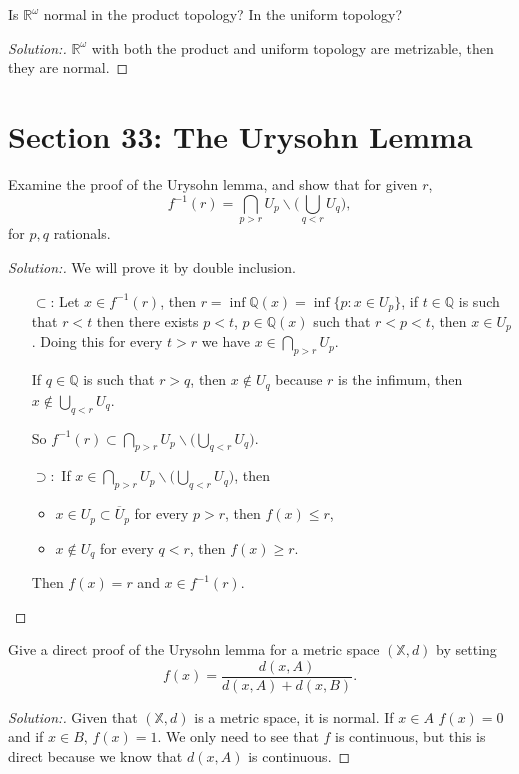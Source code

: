 \documentclass[a4paper,12pt, reqno]{article}
\theoremstyle{definition}
\newenvironment{exerr}[1]{
  \renewcommand\theexeralt{#1}
  \exeralt
}{\endexeralt}
\newenvironment{solution}{\begin{proof}[Solution:]}{\end{proof}}
\newcommand{\R}{\mathbb{R}}
\newcommand{\Q}{\mathbb{Q}}
\newcommand{\X}{\mathbb{X}}
\begin{document}
\begin{exerr}{5}
  Is $\R^\omega$ normal in the product topology? In the uniform topology?
\end{exerr}
\begin{solution}
  $\R^\omega$ with both the product and uniform topology are metrizable, then they are normal.
\end{solution}


\section*{Section 33: The Urysohn Lemma}

\begin{exerr}{1}
  Examine the proof of the Urysohn lemma, and show that for given $r$,
  \begin{equation*}
      f^{-1}(r) = \bigcap_{p>r}U_{p}\backslash\Big( \bigcup_{q<r} U_{q} \Big),
  \end{equation*}
  for $p,q$ rationals.
\end{exerr}
\begin{solution}
  We will prove it by double inclusion.
  \begin{itemize}
    \item[$\subset$:] Let $x\in f^{-1}(r)$, then $r = \inf\Q(x) = \inf\{ p : x\in U_{p} \}$, if $t\in \Q$ is such that $r<t$ then there exists $p<t$, $p\in\Q(x)$ such that $r<p<t$, then $x\in U_{p}$. Doing this for every $t>r$ we have $x\in\bigcap_{p>r}U_{p}$.
    
    If $q\in\Q$ is such that $r>q$, then $x\notin U_{q}$ because $r$ is the infimum, then $x\notin \bigcup_{q<r}U_{q}$.
    
    So $f^{-1}(r)\subset\bigcap_{p>r}U_{p}\backslash\Big( \bigcup_{q<r} U_{q} \Big)$.
    \item[$\supset:$] If $x\in\bigcap_{p>r}U_{p}\backslash \Big( \bigcup_{q<r} U_{q} \Big)$, then
    \begin{itemize}
      \item $x\in U_{p}\subset \overline{U}_{p}$ for every $p>r$, then $f(x) \leq r$,
      \item $x\notin U_{q}$ for every $q<r$, then $f(x) \geq r$.
    \end{itemize}
    Then $f(x) = r$ and $x\in f^{-1}(r)$.
  \end{itemize}
\end{solution}

\begin{exerr}{3}
  Give a direct proof of the Urysohn lemma for a metric space $(\X,d)$ by setting
  \begin{equation*}
      f(x) = \frac{d(x,A)}{d(x,A) + d(x,B)}.
  \end{equation*}
\end{exerr}
 \begin{solution}
  Given that $(\X,d)$ is a metric space, it is normal. If $x\in A$ $f(x) = 0$ and if $x\in B$, $f(x) =1$. We only need to see that $f$ is continuous, but this is direct because we know that $d(x,A)$ is continuous.
 \end{solution}
\end{document}
